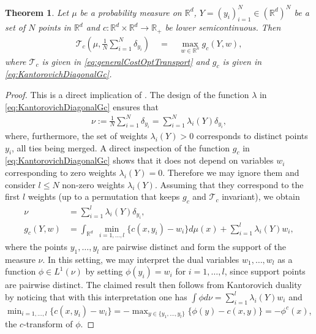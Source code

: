 \documentclass[11pt]{article}
\newcommand{\R}{\mathbb R}
\newcommand{\1}{\mathbbm{1}}
\newtheorem{thm}[lem]{Theorem}
\numberwithin{equation}{section}
\begin{document}
\begin{thm}
	Let $\mu$ be a probability measure on $\R^d$, $Y = (y_i)_{i=1}^N \in (\R^d)^N$ be a set of $N$ points in $\R^d$ and $c \colon \R^d \times \R^d \to \R_+$ be lower semicontinuous. Then 
	\begin{align*}
		\mathcal{T}_c \left(\mu, \frac{1}{N} \sum_{i=1}^N \delta_{y_i} \right) \quad =	\quad \max_{w \in \R^n} g_c(Y,w),
	\end{align*}
	where $\mathcal{T}_c$ is given in \eqref{eq:generalCostOptTransport} and $g_c$ is given in \eqref{eq:KantorovichDiagonalGc}.
	\label{th:KantorovichDiagonal}
\end{thm}
\begin{proof}
	This is a direct implication of \cite[Theorem 5.9]{villanioptoldnew}.
	The design of the function $\lambda$ in \eqref{eq:KantorovichDiagonalGc} ensures that 
	\begin{align*}
		\nu:=\frac{1}{N} \sum_{i=1}^N \delta_{y_i} = \sum_{i=1}^N \lambda_i(Y) \delta_{y_i},
	\end{align*}
	where, furthermore, the set of weights $\lambda_i(Y) > 0$ corresponds to distinct points $y_i$, all ties being merged. A direct inspection of the function $g_c$ in \eqref{eq:KantorovichDiagonalGc} shows that it does not depend on variables $w_i$ corresponding to zero weights $\lambda_i(Y) = 0$. Therefore we may ignore them and consider $l \leq N$ non-zero weights $\lambda_i(Y)$. Assuming that they correspond to the first $l$ weights (up to a permutation that keeps $g_c$ and $\mathcal{T}_c$ invariant), we obtain
	\begin{align*}
		\nu &= \sum_{i=1}^l \lambda_i(Y) \delta_{y_i},\\
		g_c(Y,w) &= \int_{\R^d} \ \min_{i=1,\ldots,l} \{c(x,y_i) - w_i\} d\mu(x) + \sum_{i=1}^l \lambda_i(Y) w_i,
	\end{align*}
	where the points $y_1,\ldots,y_l$ are pairwise distinct and form the support of the measure $\nu$. In this setting, we may interpret the dual variables $w_1,\ldots, w_l$ as a function $\phi \in L^1(\nu)$ by setting $\phi(y_i) = w_i$ for $i=1,\ldots,l$, since support points are pairwise distinct. The claimed result then follows from Kantorovich duality \cite[Theorem 5.9]{villanioptoldnew} by noticing that with this interpretation one has $\int \phi d\nu =  \sum_{i=1}^l \lambda_i(Y) w_i$ and $\min_{i=1,\ldots,l} \{c(x,y_i) - w_i\} = - \max_{y \in \{y_1,\ldots,y_l\}} \{\phi(y) - c(x,y)\} = -\phi^c(x)$, the $c$-transform of $\phi$.

\end{proof}
\end{document}
